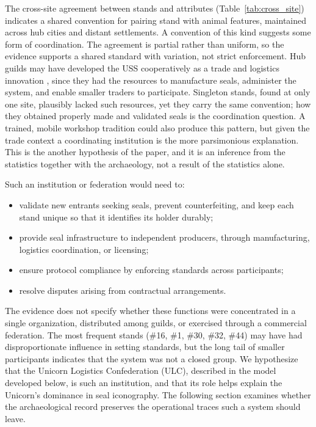 \documentclass[12pt]{article}
\begin{document}
The cross-site agreement between stands and attributes (Table~\ref{tab:cross_site})
indicates a shared convention for pairing stand with animal features, maintained across
hub cities and distant settlements. A convention of this kind suggests some form of
coordination. The agreement is partial
rather than uniform, so the evidence supports a shared standard with variation, not
strict enforcement. Hub guilds may have developed the USS cooperatively as a trade
and logistics innovation \citep{katz1985network}, since they had the resources to
manufacture seals, administer the system, and enable smaller traders to
participate. Singleton stands, found at only one site, plausibly lacked such
resources, yet they carry the same convention; how they obtained properly made
and validated seals is the coordination question. A trained, mobile workshop
tradition could also produce this pattern, but given the trade context a
coordinating institution is the more parsimonious explanation. This is the
another hypothesis of the paper, and it is an inference from the statistics
together with the archaeology, not a result of the statistics alone.

Such an institution or federation would need to:

\begin{itemize}
    \item validate new entrants seeking seals, prevent counterfeiting, and keep
    each stand unique so that it identifies its holder durably;
    \item provide seal infrastructure to independent producers, through
    manufacturing, logistics coordination, or licensing;
    \item ensure protocol compliance by enforcing standards across participants;
    \item resolve disputes arising from contractual arrangements.
\end{itemize}

The evidence does not specify whether these functions were concentrated in a
single organization, distributed among guilds, or exercised through a commercial
federation. The most frequent stands (\#16, \#1, \#30, \#32, \#44) may have had
disproportionate influence in setting standards, but the long tail of smaller
participants indicates that the system was not a closed group. We hypothesize that
the Unicorn Logistics Confederation (ULC), described in the model developed
below, is such an institution, and that its role helps explain the Unicorn's
dominance in seal iconography. The following section examines whether the
archaeological record preserves the operational traces such a system should leave.
\end{document}
